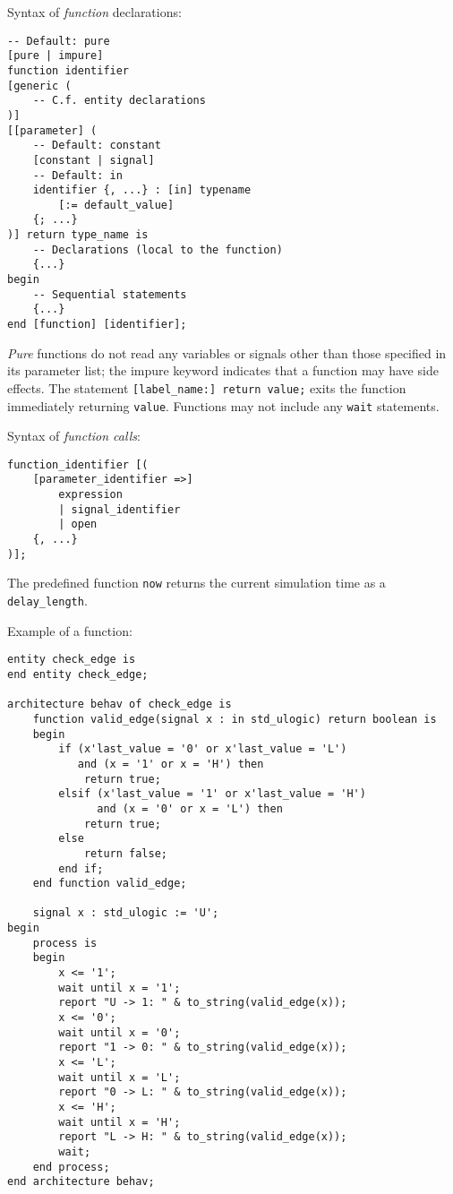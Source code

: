 \documentclass[fontsize=11pt,a4paper]{scrartcl}
\begin{document}
Syntax of \emph{function} declarations:
\begin{lstlisting}
-- Default: pure
[pure | impure]
function identifier
[generic (
	-- C.f. entity declarations
)]
[[parameter] (
	-- Default: constant
	[constant | signal]
	-- Default: in
	identifier {, ...} : [in] typename
		[:= default_value]
	{; ...}
)] return type_name is
	-- Declarations (local to the function)
	{...}
begin
	-- Sequential statements
	{...}
end [function] [identifier];
\end{lstlisting}

\emph{Pure} functions do not read any variables or signals other than those specified in its parameter list; the impure keyword indicates that a function may have side effects. The statement \lstinline![label_name:] return value;! exits the function immediately returning \lstinline!value!. Functions may not include any \lstinline!wait! statements.

Syntax of \emph{function calls}:
\begin{lstlisting}
function_identifier [(
	[parameter_identifier =>]
		expression
		| signal_identifier
		| open
	{, ...}
)];
\end{lstlisting}

The predefined function \lstinline!now! returns the current simulation time as a \lstinline!delay_length!.

Example of a function:
\begin{lstlisting}
entity check_edge is
end entity check_edge;

architecture behav of check_edge is
	function valid_edge(signal x : in std_ulogic) return boolean is
	begin
		if (x'last_value = '0' or x'last_value = 'L')
		   and (x = '1' or x = 'H') then
			return true;
		elsif (x'last_value = '1' or x'last_value = 'H')
		      and (x = '0' or x = 'L') then
			return true;
		else
			return false;
		end if;
	end function valid_edge;

	signal x : std_ulogic := 'U';
begin
	process is
	begin
		x <= '1';
		wait until x = '1';
		report "U -> 1: " & to_string(valid_edge(x));
		x <= '0';
		wait until x = '0';
		report "1 -> 0: " & to_string(valid_edge(x));
		x <= 'L';
		wait until x = 'L';
		report "0 -> L: " & to_string(valid_edge(x));
		x <= 'H';
		wait until x = 'H';
		report "L -> H: " & to_string(valid_edge(x));
		wait;
	end process;
end architecture behav;
\end{lstlisting}
\end{document}

